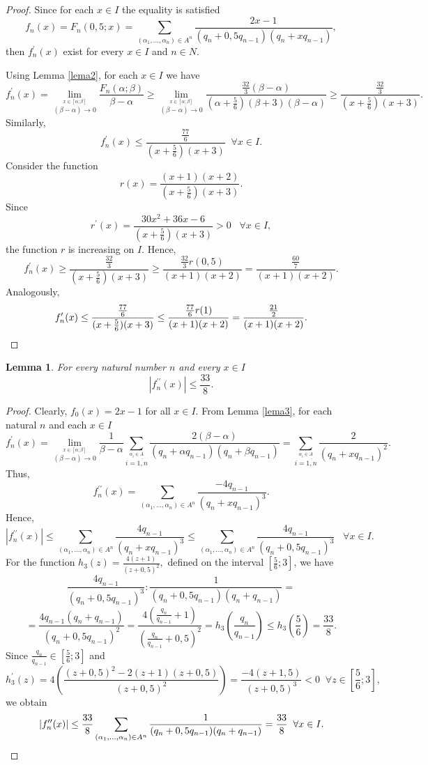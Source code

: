\documentclass[11pt]{amsart}
\theoremstyle{plain}
\newtheorem{lemma}[theorem]{Lemma}
\theoremstyle{remark}
\begin{document}
 \begin{proof}
Since for each $x \in I$ the equality is satisfied
$$f_{n}(x)=F_n(0,5;x)=\sum_{(\alpha_1,...,\alpha_n)\in A^n}\frac{2x-1}{(q_{n}+0,5q_{n-1})(q_{n}+xq_{n-1})}, $$
then $f_{n}^{'}(x)$ exist for every $x \in I$ and $n\in N$.

  Using Lemma \ref{lema2}, for each  $x \in I$ we have
  $$
  f_{n}^\prime(x)=\lim_{\stackrel{x\in [\alpha;\beta]}{(\beta-\alpha)\rightarrow 0}}\frac{F_n(\alpha;\beta)}{\beta-\alpha} \geq
   \lim_{\stackrel{x\in [\alpha;\beta]}{(\beta-\alpha)\rightarrow 0}}\frac{\frac{32}{3}(\beta-\alpha)}{(\alpha+\frac{5}{6})(\beta+3)(\beta-\alpha)} \geq \frac{\frac{32}{3}}{(x+\frac{5}{6})(x+3)}.
   $$
Similarly,
$$
  f_{n}^\prime(x)\leq\frac{\frac{77}{6}}{(x+\frac{5}{6})(x+3)} \;\; \forall x\in I.
  $$
Consider the function
$$r(x)=\frac{(x+1)(x+2)}{(x+\frac{5}{6})(x+3)}.$$
Since
$$r^\prime(x)=\frac{30 x^2+36x-6}{(x+\frac{5}{6})(x+3)}>0 \;\;\; \forall x \in I, $$
the function $r$ is increasing on $I$. Hence,
$$
  f_{n}^\prime(x)\geq \frac{\frac{32}{3}}{(x+\frac{5}{6})(x+3)} \geq \frac{\frac{32}{3}r(0,5)}{(x+1)(x+2)}=\frac{\frac{60}{7}}{(x+1)(x+2)}.$$
Analogously,
\[
  f_{n}^\prime(x)\leq \frac{\frac{77}{6}}{(x+\frac{5}{6})(x+3)} \leq \frac{\frac{77}{6}r(1)}{(x+1)(x+2)}=\frac{\frac{21}{2}}{(x+1)(x+2)}.\qedhere\]
\end{proof}
\begin{lemma}\label{lema4}
 For every natural number $n$ and every $x\in I$ 
 $$\left| f_n^{\prime\prime}(x)\right|\leq \frac{33}{8}.$$
\end{lemma}
\begin{proof}
  Clearly, $f_0(x)=2x-1$ for all $x\in I$. From Lemma \ref{lema3}, for each natural $n$ and each $x\in I$ 
  $$
   f_n^\prime(x)=\lim_{\stackrel{x\in [\alpha;\beta]}{(\beta-\alpha)\rightarrow 0}}\frac{1}{\beta-\alpha}\sum_{\stackrel{\alpha_i\in A}{i=\overline{1,n}}}\frac{2(\beta-\alpha)}{(q_{n}+\alpha q_{n-1})(q_{n}+\beta q_{n-1})}=
    \sum_{\stackrel{\alpha_i\in A}{i=\overline{1,n}}}\frac{2}{(q_n+xq_{n-1})^2}.
  $$
Thus,
   $$
    f_n^{\prime\prime}(x)=\sum_{(\alpha_1,...,\alpha_n)\in A^n}\frac{-4q_{n-1}}{(q_n+xq_{n-1})^3}.
  $$
  Hence,
  $$
    \left| f_n^{\prime\prime}(x)\right|\leq \sum_{(\alpha_1,...,\alpha_n)\in A^n}\frac{4q_{n-1}}{(q_n+xq_{n-1})^3}\leq \sum_{(\alpha_1,...,\alpha_n)\in A^n}\frac{4q_{n-1}}{(q_n+0,5q_{n-1})^3} \;\;\; \forall x\in I.
  $$
For the function $h_{3}(z)=\frac{4(z+1)}{(z+0,5)^2},$ defined on the interval $[\frac{5}{6};3]$,  we have
   $$\frac{4q_{n-1}}{(q_n+0,5q_{n-1})^3}: \frac{1}{(q_n+0,5q_{n-1})(q_n+q_{n-1})}=$$
   $$=\frac{4q_{n-1}(q_n+q_{n-1})}{(q_n+0,5q_{n-1})^2}=
  \frac{4\left(\frac{q_n}{q_{n-1}}+1\right)}{\left(\frac{q_n}{q_{n-1}}+0,5\right)^2}=h_{3}(\frac{q_n}{q_{n-1}}) \leq h_{3}(\frac{5}{6})= \frac{33}{8}.$$
   Since $\frac{q_n}{q_{n-1}}\in[\frac{5}{6};3]$ and
   $$h_{3}^\prime(z)=4\left(\frac{(z+0,5)^2-2(z+1)(z+0,5)}{(z+0,5)^2}\right)=\frac{-4(z+1,5)}{(z+0,5)^3}<0 \;\; \forall z\in[\frac{5}{6};3],$$
   we obtain
   \[
    \left| f_n^{\prime\prime}(x)\right|\leq \frac{33}{8}\sum_{(\alpha_1,...,\alpha_n)\in A^n}\frac{1}{(q_n+0,5q_{n-1})(q_n+q_{n-1})}=\frac{33}{8} \;\;  \forall x\in I.\qedhere \]
\end{proof}
\end{document}
